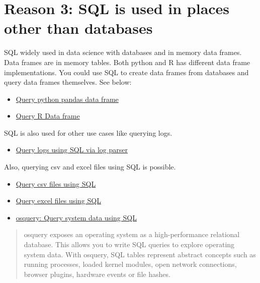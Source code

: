 \documentclass[
  letterpaper,
  DIV=11,
  numbers=noendperiod]{scrreprt}
\providecommand{\tightlist}{%
  \setlength{\itemsep}{0pt}\setlength{\parskip}{0pt}}\usepackage{longtable,booktabs,array}
\begin{document}
\section*{Reason 3: SQL is used in places other than
databases}\label{reason-3-sql-is-used-in-places-other-than-databases}


SQL widely used in data science with databases and in memory data
frames. Data frames are in memory tables. Both python and R has
different data frame implementations. You could use SQL to create data
frames from databases and query data frames themselves. See below:

\begin{itemize}
\item
  \href{https://stackoverflow.com/questions/45865608/executing-an-sql-query-on-a-pandas-dataset}{Query
  python pandas data frame}
\item
  \href{https://www.rdocumentation.org/packages/sqldf/versions/0.4-11}{Query
  R Data frame}
\end{itemize}

SQL is also used for other use cases like querying logs.

\begin{itemize}
\tightlist
\item
  \href{https://techcommunity.microsoft.com/t5/exchange-team-blog/introducing-log-parser-studio/ba-p/601131}{Query
  logs using SQL via log parser}
\end{itemize}

Also, querying csv and excel files using SQL is possible.

\begin{itemize}
\item
  \href{https://superuser.com/questions/7169/querying-a-csv-file}{Query
  csv files using SQL}
\item
  \href{https://stackoverflow.com/questions/18798522/how-to-run-a-sql-query-on-an-excel-table}{Query
  excel files using SQL}
\item
  \href{https://osquery.readthedocs.io/en/stable/}{osquery: Query system
  data using SQL}
\end{itemize}

\begin{quote}
osquery exposes an operating system as a high-performance relational
database. This allows you to write SQL queries to explore operating
system data. With osquery, SQL tables represent abstract concepts such
as running processes, loaded kernel modules, open network connections,
browser plugins, hardware events or file hashes.
\end{quote}
\end{document}
